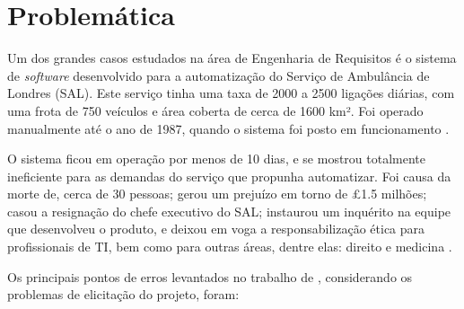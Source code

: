 \section{Problemática}
\label{ref:problematica}
    
Um dos grandes casos estudados na área de Engenharia de Requisitos é o sistema de \textit{software} desenvolvido para a automatização do Serviço de Ambulância de Londres (SAL). Este serviço tinha uma taxa de 2000 a 2500 ligações diárias, com uma frota de 750 veículos e área coberta de cerca de 1600 km². Foi operado manualmente até o ano de 1987, quando o sistema foi posto em funcionamento \cite{LodonFiasco}.

O sistema ficou em operação por menos de 10 dias, e se mostrou totalmente ineficiente para as demandas do serviço que propunha automatizar. Foi causa da morte de, cerca de 30 pessoas; gerou um prejuízo em torno de £1.5 milhões; casou a resignação do chefe executivo do SAL; instaurou um inquérito na equipe que desenvolveu o produto, e deixou em voga a responsabilização ética para profissionais de TI, bem como para outras áreas, dentre elas: direito e medicina \cite{LodonFiasco}.

Os principais pontos de erros levantados no trabalho de \cite{LodonFiasco}, considerando os problemas de elicitação do projeto, foram:

